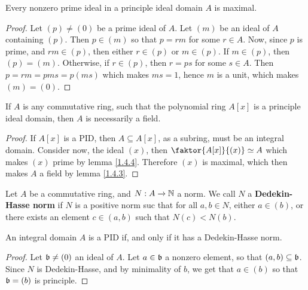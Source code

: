\begin{lemma}\label{2.2.2}
    Every nonzero prime ideal in a principle ideal domain $A$ is maximal.
\end{lemma}
\begin{proof}
    Let $(p) \neq (0)$ be a prime ideal of $A$. Let $(m)$ be an ideal of $A$
    containing $(p)$. Then $p \in (m)$ so that $p=rm$ for some  $r \in A$. Now,
    since $p$ is prime, and $rm \in (p)$, then either $r \in (p)$ or $m \in
    (p)$. If $m \in (p)$, then $(p)=(m)$. Otherwise, if $r \in (p)$, then $r=ps$
    for some  $s \in A$. Then  $p=rm=pms=p(ms)$ which makes $ms=1$, hence $m$ is
    a unit, which makes $(m)=(0)$.
\end{proof}
\begin{corollary}
    If $A$ is any commutative ring, such that the polynomial ring $A[x]$ is a
    principle ideal domain, then $A$ is necessarily a field.
\end{corollary}
\begin{proof}
    If $A[x]$ is a PID, then $A \subseteq A[x]$, as a subring, must be an
    integral domain. Consider now, the ideal $(x)$, then $\faktor{A[x]}{(x)}
    \simeq A$ which makes $(x)$ prime by lemma \ref{1.4.4}. Therefore $(x)$ is
    maximal, which then makes $A$ a field by lemma \ref{1.4.3}.
\end{proof}

\begin{definition}
    Let $A$ be a commutative ring, and  $N:A \xrightarrow{} \N$ a norm. We call
    $N$ a \textbf{Dedekin-Hasse norm} if $N$ is a positive norm suc that for
    all $a,b \in N$, either $a \in (b)$, or there exists an element $c \in
    (a,b)$ such that $N(c)<N(b)$.
\end{definition}

\begin{lemma}\label{2.2.3}
    An integral domain $A$ is a PID if, and only if it has a Dedekin-Hasse norm.
\end{lemma}
\begin{proof}
    Let $\bf \neq (0)$ an ideal of $A$. Let $a \in \bf$ a nonzero element, so that
    $(a,b) \subseteq \bf$. Since $N$ is Dedekin-Hasse, and by minimality of $b$,
    we get that $a \in (b)$ so that $\bf=(b)$ is principle.
\end{proof}

